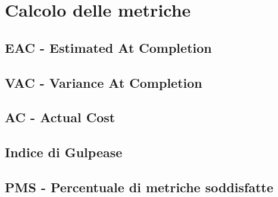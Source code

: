 \section{Calcolo delle metriche}

\subsection{EAC - Estimated At Completion}

\subsection{VAC - Variance At Completion}

\subsection{AC - Actual Cost}

\subsection{Indice di Gulpease}

\subsection{PMS - Percentuale di metriche soddisfatte}
